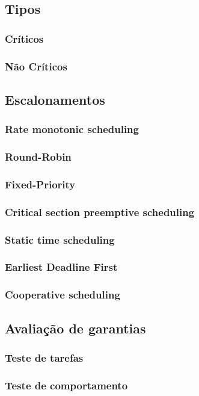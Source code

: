 \documentclass{article}
\begin{document}
		\subsection{Tipos}
		\subsubsection{Críticos}
		\subsubsection{Não Críticos}
		\subsection{Escalonamentos}
		\subsubsection{Rate monotonic scheduling}
		\subsubsection{Round-Robin}
		\subsubsection{Fixed-Priority}
		\subsubsection{Critical section preemptive scheduling}
		\subsubsection{Static time scheduling}
		\subsubsection{Earliest Deadline First}
		\subsubsection{Cooperative scheduling}

	\subsection{Avaliação de garantias}
		\subsubsection{Teste de tarefas}
		\subsubsection{Teste de comportamento}
\end{document}
